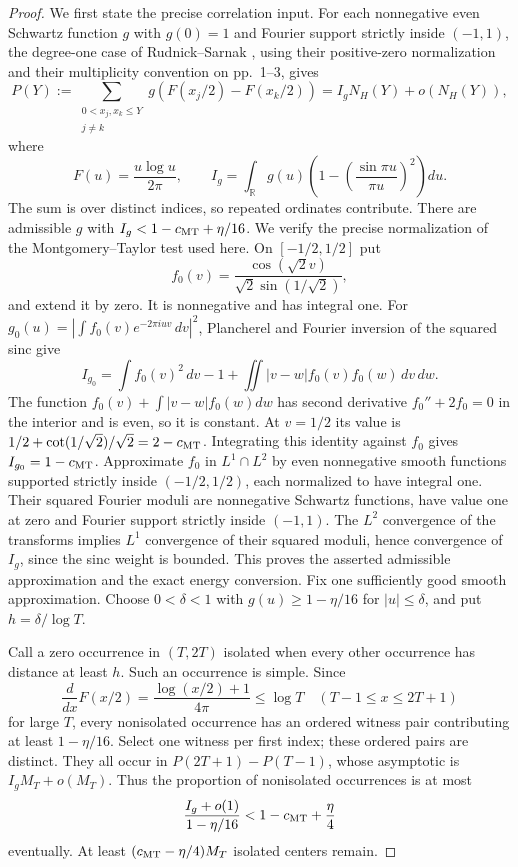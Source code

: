 \begin{proof}
We first state the precise correlation input. For each nonnegative even Schwartz function $g$ with $g(0)=1$ and Fourier support strictly inside $(-1,1)$, the degree-one case of Rudnick--Sarnak \cite[Theorems~1.1--1.2, pp.~4--5]{rudnick-sarnak}, using their positive-zero normalization and their multiplicity convention on pp.~1--3, gives
\[
 P(Y):=\sum_{\substack{0<x_j,x_k\le Y\\j\ne k}}
       g(F(x_j/2)-F(x_k/2))
       =I_gN_H(Y)+o(N_H(Y)),
\]
where
\[
 F(u)=\frac{u\log u}{2\pi},\qquad
 I_g=\int_{\mathbb R}g(u)
           \left(1-\left(\frac{\sin\pi u}{\pi u}\right)^2\right)du.
\]
The sum is over distinct indices, so repeated ordinates contribute.
There are admissible $g$ with $I_g<1-c_{\rm MT}+\eta/16$.
We verify the precise normalization of the Montgomery--Taylor test
used here. On $[-1/2,1/2]$ put
\[
 f_0(v)=\frac{\cos(\sqrt2v)}{\sqrt2\sin(1/\sqrt2)},
\]
and extend it by zero. It is nonnegative and has integral one.
For $g_0(u)=|\int f_0(v)e^{-2\pi iuv}\,dv|^2$, Plancherel and
Fourier inversion of the squared sinc give
\[
 I_{g_0}=\int f_0(v)^2\,dv-1+
       \iint |v-w|f_0(v)f_0(w)\,dv\,dw.
\]
The function $f_0(v)+\int|v-w|f_0(w)dw$ has second derivative
$f_0''+2f_0=0$ in the interior and is even, so it is constant.
At $v=1/2$ its value is
$1/2+\cot(1/\sqrt2)/\sqrt2=2-c_{\rm MT}$.
Integrating this identity against $f_0$ gives
$I_{g_0}=1-c_{\rm MT}$.
Approximate $f_0$ in $L^1\cap L^2$ by even nonnegative smooth
functions supported strictly inside $(-1/2,1/2)$, each normalized
to have integral one. Their squared Fourier moduli are nonnegative
Schwartz functions, have value one at zero and Fourier support
strictly inside $(-1,1)$. The $L^2$ convergence of the transforms
implies $L^1$ convergence of their squared moduli, hence convergence
of $I_g$, since the sinc weight is bounded. This proves the asserted
admissible approximation and the exact energy conversion.
Fix one sufficiently good smooth approximation. Choose $0<\delta<1$ with $g(u)\ge1-\eta/16$ for $|u|\le\delta$, and put $h=\delta/\log T$.

Call a zero occurrence in $(T,2T)$ isolated when every other occurrence has distance at least $h$. Such an occurrence is simple. Since
\[
 \frac{d}{dx}F(x/2)=\frac{\log(x/2)+1}{4\pi}\le\log T
 \quad(T-1\le x\le2T+1)
\]
for large $T$, every nonisolated occurrence has an ordered witness pair contributing at least $1-\eta/16$. Select one witness per first index; these ordered pairs are distinct. They all occur in
$P(2T+1)-P(T-1)$, whose asymptotic is $I_gM_T+o(M_T)$.
Thus the proportion of nonisolated occurrences is at most
\[
 \frac{I_g+o(1)}{1-\eta/16}
 <1-c_{\rm MT}+\frac\eta4
\]
eventually. At least $(c_{\rm MT}-\eta/4)M_T$ isolated centers remain.


\end{proof}
